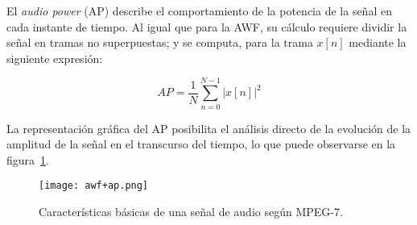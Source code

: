 El \textit{audio power} (AP) describe el comportamiento de la potencia de la señal en cada instante de tiempo.
Al igual que para la AWF, su cálculo requiere dividir la señal en tramas no superpuestas;
y se computa, para la trama $x[n]$ mediante la siguiente expresión:

\begin{equation}
    \label{eq:AP}
    AP = \frac{1}{N}\sum_{n=0}^{N-1}{|x[n]|^2}
\end{equation}

La representación gráfica del AP posibilita el análisis directo de la evolución de la amplitud de la señal en el transcurso del tiempo, lo que puede observarse en la figura~\ref{img:awf+ap}.

\begin{figure}[!h]
    \centering
    \texttt{[image: awf+ap.png]}
    \caption{Características básicas de una señal de audio según MPEG-7.}
    \label{img:awf+ap}
\end{figure}


